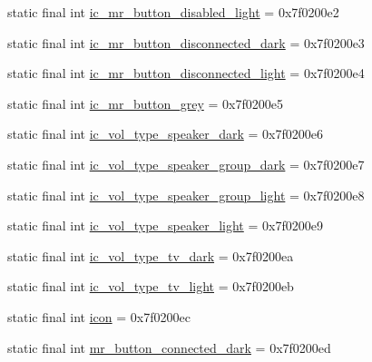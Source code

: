 \begin{CompactItemize}
\item 
static final int \hyperlink{classandroid_1_1support_1_1v7_1_1mediarouter_1_1_r_1_1drawable_add5385d2e1090e2aaaf6920988e2f06}{ic\_\-mr\_\-button\_\-disabled\_\-light} = 0x7f0200e2
\item 
static final int \hyperlink{classandroid_1_1support_1_1v7_1_1mediarouter_1_1_r_1_1drawable_fcd363a854ac97f70265b2c360d3f2f8}{ic\_\-mr\_\-button\_\-disconnected\_\-dark} = 0x7f0200e3
\item 
static final int \hyperlink{classandroid_1_1support_1_1v7_1_1mediarouter_1_1_r_1_1drawable_2e5d63c9cde7321e694132fa8410634d}{ic\_\-mr\_\-button\_\-disconnected\_\-light} = 0x7f0200e4
\item 
static final int \hyperlink{classandroid_1_1support_1_1v7_1_1mediarouter_1_1_r_1_1drawable_2ea29e7fcec902e2c33043066beeba81}{ic\_\-mr\_\-button\_\-grey} = 0x7f0200e5
\item 
static final int \hyperlink{classandroid_1_1support_1_1v7_1_1mediarouter_1_1_r_1_1drawable_a793a062bd853299fabf75786b5dd557}{ic\_\-vol\_\-type\_\-speaker\_\-dark} = 0x7f0200e6
\item 
static final int \hyperlink{classandroid_1_1support_1_1v7_1_1mediarouter_1_1_r_1_1drawable_c5d633920bf5d7232568d8f9e12a3284}{ic\_\-vol\_\-type\_\-speaker\_\-group\_\-dark} = 0x7f0200e7
\item 
static final int \hyperlink{classandroid_1_1support_1_1v7_1_1mediarouter_1_1_r_1_1drawable_8dfdfbd96d36ba77c94c9d7e52303071}{ic\_\-vol\_\-type\_\-speaker\_\-group\_\-light} = 0x7f0200e8
\item 
static final int \hyperlink{classandroid_1_1support_1_1v7_1_1mediarouter_1_1_r_1_1drawable_3291ad14dddc9404704afde048e16739}{ic\_\-vol\_\-type\_\-speaker\_\-light} = 0x7f0200e9
\item 
static final int \hyperlink{classandroid_1_1support_1_1v7_1_1mediarouter_1_1_r_1_1drawable_7fe4ece6d69ab62d5495b69ea5ad8a63}{ic\_\-vol\_\-type\_\-tv\_\-dark} = 0x7f0200ea
\item 
static final int \hyperlink{classandroid_1_1support_1_1v7_1_1mediarouter_1_1_r_1_1drawable_64cbd7296439d7b40846a11c502594d7}{ic\_\-vol\_\-type\_\-tv\_\-light} = 0x7f0200eb
\item 
static final int \hyperlink{classandroid_1_1support_1_1v7_1_1mediarouter_1_1_r_1_1drawable_695c768cab85f19bff0bbd3f9916d5cd}{icon} = 0x7f0200ec
\item 
static final int \hyperlink{classandroid_1_1support_1_1v7_1_1mediarouter_1_1_r_1_1drawable_e6129f10217639b491dcc2f58dde4b70}{mr\_\-button\_\-connected\_\-dark} = 0x7f0200ed

\end{CompactItemize}
